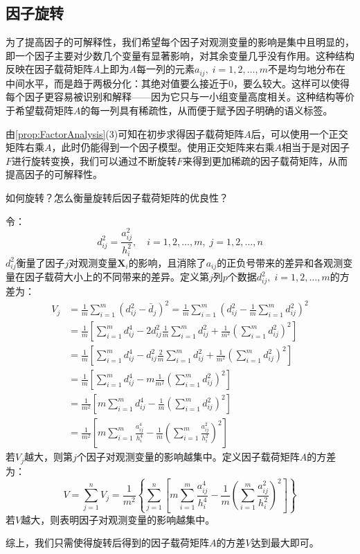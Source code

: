 \subsection{因子旋转}
为了提高因子的可解释性，我们希望每个因子对观测变量的影响是集中且明显的，即一个因子主要对少数几个变量有显著影响，对其余变量几乎没有作用。这种结构反映在因子载荷矩阵$A$上即为$A$每一列的元素$a_{ij},\;i=1,2,\dots,m$不是均匀地分布在中间水平，而是趋于两极分化：其绝对值要么接近于$0$，要么较大。这样可以使得每个因子更容易被识别和解释——因为它只与一小组变量高度相关。这种结构等价于希望载荷矩阵$A$的每一列具有稀疏性，从而便于赋予因子明确的语义标签。
\begin{derivation}
	由\cref{prop:FactorAnalysis}(3)可知在初步求得因子载荷矩阵$A$后，可以使用一个正交矩阵右乘$A$，此时仍能得到一个因子模型。使用正交矩阵来右乘$A$相当于是对因子$F$进行旋转变换，我们可以通过不断旋转$F$来得到更加稀疏的因子载荷矩阵，从而提高因子的可解释性。\par
	如何旋转？怎么衡量旋转后因子载荷矩阵的优良性？\par
	令：
	\begin{equation*}
		d_{ij}^2=\frac{a_{ij}^2}{h_i^2},\quad i=1,2,\dots,m,\;j=1,2,\dots,n
	\end{equation*}
	$d_{ij}^2$衡量了因子$j$对观测变量$\mathbf{X}_i$的影响，且消除了$a_{ij}$的正负号带来的差异和各观测变量在因子载荷大小上的不同带来的差异。定义第$j$列$p$个数据$d_{ij}^2,\;i=1,2,\dots,m$的方差为：
	\begin{align*}
		V_j&=\frac{1}{m}\sum_{i=1}^{m}(d_{ij}^2-\bar{d}_j)^2=\frac{1}{m}\sum_{i=1}^{m}\left(d_{ij}^2-\frac{1}{m}\sum_{i=1}^{m}d_{ij}^2\right)^2 \\
		&=\frac{1}{m}\left[\sum_{i=1}^{m}d_{ij}^4-2d_{ij}^2\frac{1}{m}\sum_{i=1}^{m}d_{ij}^2+\frac{1}{m^2}\left(\sum_{i=1}^{m}d_{ij}^2\right)^2\right] \\
		&=\frac{1}{m}\left[\sum_{i=1}^{m}d_{ij}^4-d_{ij}^2\frac{2}{m}\sum_{i=1}^{m}d_{ij}^2+\frac{1}{m^2}\left(\sum_{i=1}^{m}d_{ij}^2\right)^2\right] \\
		&=\frac{1}{m}\left[\sum_{i=1}^{m}d_{ij}^4-m\frac{1}{m^2}\left(\sum_{i=1}^{m}d_{ij}^2\right)^2\right] \\
		&=\frac{1}{m^2}\left[m\sum_{i=1}^{m}d_{ij}^4-\frac{1}{m}\left(\sum_{i=1}^{m}d_{ij}^2\right)^2\right] \\
		&=\frac{1}{m^2}\left[m\sum_{i=1}^{m}\frac{a_{ij}^4}{h_i^4}-\frac{1}{m}\left(\sum_{i=1}^{m}\frac{a_{ij}^2}{h_i^2}\right)^2\right]
	\end{align*}
	若$V_j$越大，则第$j$个因子对观测变量的影响越集中。定义因子载荷矩阵$A$的方差为：
	\begin{equation*}
		V=\sum_{j=1}^{n}V_j=\frac{1}{m^2}\left\{\sum_{j=1}^{n}\left[m\sum_{i=1}^{m}\frac{a_{ij}^4}{h_i^4}-\frac{1}{m}\left(\sum_{i=1}^{m}\frac{a_{ij}^2}{h_i^2}\right)^2\right]\right\}
	\end{equation*}
	若$V$越大，则表明因子对观测变量的影响越集中。\par
	综上，我们只需使得旋转后得到的因子载荷矩阵$A$的方差$V$达到最大即可。
\end{derivation}

